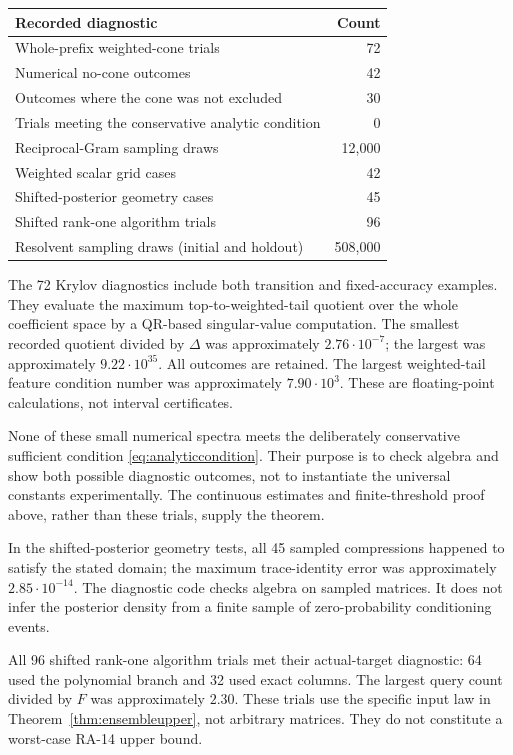 \documentclass[11pt]{article}
\theoremstyle{definition}
\begin{document}
\begin{center}
\begin{tabular}{@{}p{}r@{}}
\toprule
Recorded diagnostic & Count\\
\midrule
Whole-prefix weighted-cone trials & 72\\
Numerical no-cone outcomes & 42\\
Outcomes where the cone was not excluded & 30\\
Trials meeting the conservative analytic condition & 0\\
Reciprocal-Gram sampling draws & 12,000\\
Weighted scalar grid cases & 42\\
Shifted-posterior geometry cases & 45\\
Shifted rank-one algorithm trials & 96\\
Resolvent sampling draws (initial and holdout) & 508,000\\
\bottomrule
\end{tabular}
\end{center}
The 72 Krylov diagnostics include both transition and fixed-accuracy examples. They evaluate the maximum top-to-weighted-tail quotient over the whole coefficient space by a QR-based singular-value computation. The smallest recorded quotient divided by $\Delta$ was approximately $2.76\cdot10^{-7}$; the largest was approximately $9.22\cdot10^{35}$. All outcomes are retained. The largest weighted-tail feature condition number was approximately $7.90\cdot10^3$. These are floating-point calculations, not interval certificates.

None of these small numerical spectra meets the deliberately conservative sufficient condition \eqref{eq:analyticcondition}. Their purpose is to check algebra and show both possible diagnostic outcomes, not to instantiate the universal constants experimentally. The continuous estimates and finite-threshold proof above, rather than these trials, supply the theorem.

In the shifted-posterior geometry tests, all 45 sampled compressions happened to satisfy the stated domain; the maximum trace-identity error was approximately $2.85\cdot10^{-14}$. The diagnostic code checks algebra on sampled matrices. It does not infer the posterior density from a finite sample of zero-probability conditioning events.

All 96 shifted rank-one algorithm trials met their actual-target diagnostic: 64 used the polynomial branch and 32 used exact columns. The largest query count divided by $F$ was approximately $2.30$. These trials use the specific input law in Theorem~\ref{thm:ensembleupper}, not arbitrary matrices. They do not constitute a worst-case RA-14 upper bound.
\end{document}

